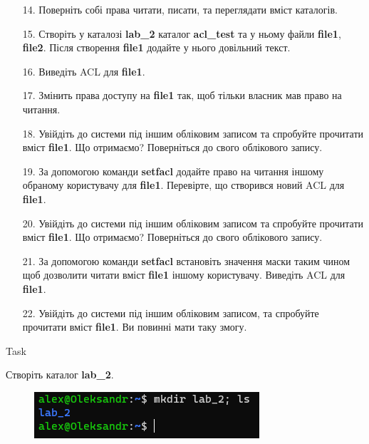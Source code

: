 \documentclass[a4paper,12pt]{article}
\newcommand{\RomanNumeralCaps}[1]{\MakeUppercase{\romannumeral #1}}
\begin{document}
\newpage
    \begin{enumerate}
    \item[14.] Поверніть собі права читати, писати, та переглядати вміст каталогів.
    \item[15.] Створіть у каталозі \textbf{lab\_2} каталог \textbf{acl\_test} та у ньому файли \textbf{file1}, \textbf{file2}. Після створення \textbf{file1} додайте у 
    нього довільний текст.
    \item[16.] Виведіть ACL для \textbf{file1}.
    \item[17.] Змінить права доступу на \textbf{file1} так, щоб тільки власник мав право на читання.
    \item[18.] Увійдіть до системи під іншим обліковим записом та спробуйте прочитати вміст \textbf{file1}. Що отримаємо? Поверніться до свого облікового запису.
    \item[19.] За допомогою команди \textbf{setfacl} додайте право на читання іншому обраному користувачу для \textbf{file1}. Перевірте, що створився новий ACL для \textbf{file1}.
    \item[20.] Увійдіть до системи під іншим обліковим записом та спробуйте прочитати вміст \textbf{file1}. Що отримаємо? Поверніться до свого облікового запису.
    \item[21.] За допомогою команди \textbf{setfacl} встановіть значення маски таким чином щоб дозволити читати вміст \textbf{file1} іншому користувачу. Виведіть ACL для \textbf{file1}.
    \item[22.] Увійдіть до системи під іншим обліковим записом, та спробуйте прочитати вміст \textbf{file1}. Ви повинні мати таку змогу.
    \end{enumerate}

\newpage
    \begin{center}
        \Large{Task \RomanNumeralCaps{1}}
    \end{center}
    Створіть каталог \textbf{lab\_2}.
    \begin{figure}[h!]
        \begin{minipage}[h]{1\linewidth}
            \centering
            \includegraphics[width=0.5\linewidth]{Prt sc/Figure_1.png}  
        \end{minipage}
    \end{figure}
\end{document}
